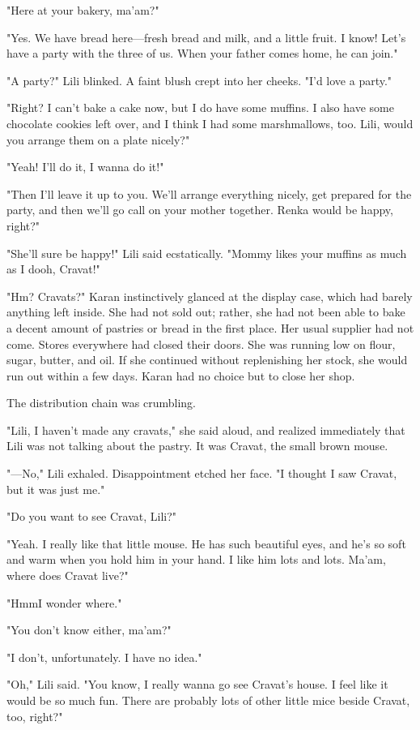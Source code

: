 "Here at your bakery, ma'am?"

"Yes. We have bread here---fresh bread and milk, and a little fruit. I
know! Let's have a party with the three of us. When your father comes
home, he can join."

"A party?" Lili blinked. A faint blush crept into her cheeks. "I'd love
a party."

"Right? I can't bake a cake now, but I do have some muffins. I also have
some chocolate cookies left over, and I think I had some marshmallows,
too. Lili, would you arrange them on a plate nicely?"

"Yeah! I'll do it, I wanna do it!"

"Then I'll leave it up to you. We'll arrange everything nicely, get
prepared for the party, and then we'll go call on your mother together.
Renka would be happy, right?"

"She'll sure be happy!" Lili said ecstatically. "Mommy likes your
muffins as much as I do\el oh, Cravat!"

"Hm? Cravats?" Karan instinctively glanced at the display case, which
had barely anything left inside. She had not sold out; rather, she had
not been able to bake a decent amount of pastries or bread in the first
place. Her usual supplier had not come. Stores everywhere had closed
their doors. She was running low on flour, sugar, butter, and oil. If
she continued without replenishing her stock, she would run out within a
few days. Karan had no choice but to close her shop.

The distribution chain was crumbling.

"Lili, I haven't made any cravats," she said aloud, and realized
immediately that Lili was not talking about the pastry. It was Cravat,
the small brown mouse.

"---No," Lili exhaled. Disappointment etched her face. "I thought I saw
Cravat, but it was just me."

"Do you want to see Cravat, Lili?"

"Yeah. I really like that little mouse. He has such beautiful eyes, and
he's so soft and warm when you hold him in your hand. I like him lots
and lots. Ma'am, where does Cravat live?"

"Hmm\el I wonder where."

"You don't know either, ma'am?"

"I don't, unfortunately. I have no idea."

"Oh," Lili said. "You know, I really wanna go see Cravat's house. I feel
like it would be so much fun. There are probably lots of other little
mice beside Cravat, too, right?"

